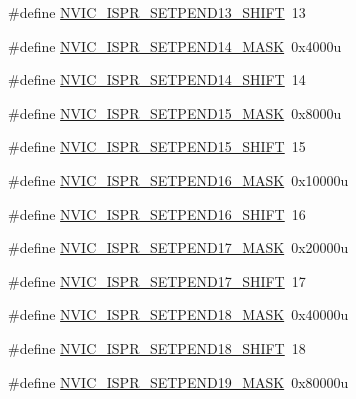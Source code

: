 \begin{DoxyCompactItemize}
\item 
\#define \hyperlink{group___n_v_i_c___register___masks_gaec25203b95f9bcf3d553c12114d66c7c}{N\+V\+I\+C\+\_\+\+I\+S\+P\+R\+\_\+\+S\+E\+T\+P\+E\+N\+D13\+\_\+\+S\+H\+I\+FT}~13
\item 
\#define \hyperlink{group___n_v_i_c___register___masks_gac250d17b53ce80efc7beb7fef6061aaa}{N\+V\+I\+C\+\_\+\+I\+S\+P\+R\+\_\+\+S\+E\+T\+P\+E\+N\+D14\+\_\+\+M\+A\+SK}~0x4000u
\item 
\#define \hyperlink{group___n_v_i_c___register___masks_ga11b832f7522dbcf7fe4e6d6699b5ef9c}{N\+V\+I\+C\+\_\+\+I\+S\+P\+R\+\_\+\+S\+E\+T\+P\+E\+N\+D14\+\_\+\+S\+H\+I\+FT}~14
\item 
\#define \hyperlink{group___n_v_i_c___register___masks_gab34dbcc7a5e039cccfc8baacd02f645b}{N\+V\+I\+C\+\_\+\+I\+S\+P\+R\+\_\+\+S\+E\+T\+P\+E\+N\+D15\+\_\+\+M\+A\+SK}~0x8000u
\item 
\#define \hyperlink{group___n_v_i_c___register___masks_gacb3a8004dd843b014fe972875f1e7f10}{N\+V\+I\+C\+\_\+\+I\+S\+P\+R\+\_\+\+S\+E\+T\+P\+E\+N\+D15\+\_\+\+S\+H\+I\+FT}~15
\item 
\#define \hyperlink{group___n_v_i_c___register___masks_ga32cc62a5ffdc8cb071b431b9a6d010a7}{N\+V\+I\+C\+\_\+\+I\+S\+P\+R\+\_\+\+S\+E\+T\+P\+E\+N\+D16\+\_\+\+M\+A\+SK}~0x10000u
\item 
\#define \hyperlink{group___n_v_i_c___register___masks_ga9c4d942935688b7a8b877f661ceea3f4}{N\+V\+I\+C\+\_\+\+I\+S\+P\+R\+\_\+\+S\+E\+T\+P\+E\+N\+D16\+\_\+\+S\+H\+I\+FT}~16
\item 
\#define \hyperlink{group___n_v_i_c___register___masks_ga26e79f495baa012fcc56361f77367ab6}{N\+V\+I\+C\+\_\+\+I\+S\+P\+R\+\_\+\+S\+E\+T\+P\+E\+N\+D17\+\_\+\+M\+A\+SK}~0x20000u
\item 
\#define \hyperlink{group___n_v_i_c___register___masks_gae328591548530e5190483af66623fdb3}{N\+V\+I\+C\+\_\+\+I\+S\+P\+R\+\_\+\+S\+E\+T\+P\+E\+N\+D17\+\_\+\+S\+H\+I\+FT}~17
\item 
\#define \hyperlink{group___n_v_i_c___register___masks_gabf2dc860a6cc09ba0f85a78cc8ea78de}{N\+V\+I\+C\+\_\+\+I\+S\+P\+R\+\_\+\+S\+E\+T\+P\+E\+N\+D18\+\_\+\+M\+A\+SK}~0x40000u
\item 
\#define \hyperlink{group___n_v_i_c___register___masks_gabc9d1b04dd349562936c1d72bd78b155}{N\+V\+I\+C\+\_\+\+I\+S\+P\+R\+\_\+\+S\+E\+T\+P\+E\+N\+D18\+\_\+\+S\+H\+I\+FT}~18
\item 
\#define \hyperlink{group___n_v_i_c___register___masks_ga2a463208e88c875664a5b82164671708}{N\+V\+I\+C\+\_\+\+I\+S\+P\+R\+\_\+\+S\+E\+T\+P\+E\+N\+D19\+\_\+\+M\+A\+SK}~0x80000u

\end{DoxyCompactItemize}
